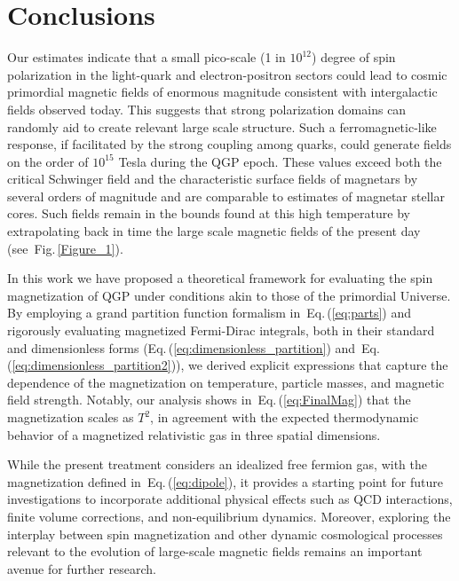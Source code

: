 \documentclass[epjST]{svjour}
\newcommand{\req}[1]{Eq.\,(\ref{#1})}
\newcommand{\rf}[1]{Fig.\,{\ref{#1}}}
\begin{document}
\section{Conclusions}
\label{sec:conclusions}
Our estimates indicate that {\color{blue}a small pico-scale (1 in $10^{12}$)} degree of spin polarization in the light-quark and electron-positron sectors could lead to cosmic primordial magnetic fields of enormous magnitude consistent with intergalactic fields observed today. This suggests that strong polarization domains can randomly aid to create relevant large scale structure. Such a ferromagnetic-like response, if facilitated by the strong coupling among quarks, could generate fields on the order of \(10^{15}\) Tesla during the QGP epoch. These values exceed both the critical Schwinger field and the characteristic surface fields of magnetars by several orders of magnitude and are comparable to estimates of magnetar stellar cores. Such fields remain in the bounds found at this high temperature by extrapolating back in time the large scale magnetic fields of the present day (see~\rf{Figure_1}).

In this work we have proposed a theoretical framework for evaluating the spin magnetization of QGP under conditions akin to those of the primordial Universe. By employing a grand partition function formalism in~\req{eq:parts} and rigorously evaluating magnetized Fermi-Dirac integrals, both in their standard and dimensionless forms (\req{eq:dimensionless_partition} and~\req{eq:dimensionless_partition2}), we derived explicit expressions that capture the dependence of the magnetization on temperature, particle masses, and magnetic field strength. Notably, our analysis shows in~\req{eq:FinalMag} that the magnetization scales as \(T^2\), in agreement with the expected thermodynamic behavior of a magnetized relativistic gas in three spatial dimensions.

While the present treatment considers an idealized free fermion gas, with the magnetization defined in~\req{eq:dipole}, it provides a starting point for future investigations to incorporate additional physical effects such as QCD interactions, finite volume corrections, and non-equilibrium dynamics. Moreover, exploring the interplay between spin magnetization and other dynamic cosmological processes relevant to the evolution of large-scale magnetic fields remains an important avenue for further research.\\
\end{document}

